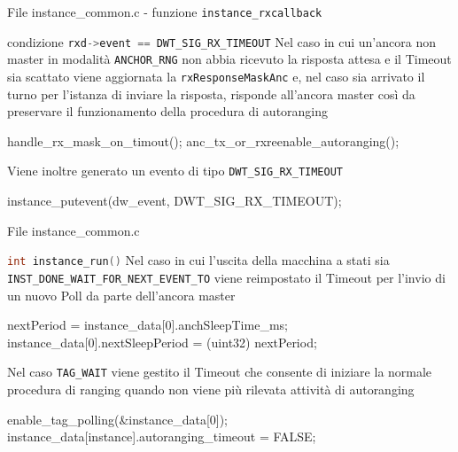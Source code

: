 \begin{frame}[fragile]{File instance\_common.c - funzione \lstinline[language=C]!instance_rxcallback!}
  \begin{block}{condizione \lstinline[language=C]!rxd->event == DWT_SIG_RX_TIMEOUT!}
    Nel caso in cui un'ancora \alert{non} master in modalità \lstinline[language=C]!ANCHOR_RNG! non abbia ricevuto la risposta attesa e il Timeout sia scattato viene
    aggiornata la \lstinline[language=C]!rxResponseMaskAnc! e, nel caso sia arrivato il turno per l'istanza di inviare la risposta, risponde all'ancora master così da preservare il funzionamento della procedura di autoranging
    \begin{C}
      handle_rx_mask_on_timout();
      anc_tx_or_rxreenable_autoranging();
    \end{C}
    Viene inoltre generato un evento di tipo \lstinline[language=C]!DWT_SIG_RX_TIMEOUT!
    \begin{C}
      instance_putevent(dw_event, DWT_SIG_RX_TIMEOUT);
    \end{C}
  \end{block}
\end{frame}

\begin{frame}[fragile]{File instance\_common.c}
  \begin{block}{\lstinline[language=C]!int instance_run()!}
    Nel caso in cui l'uscita della macchina a stati sia \lstinline[language=C]!INST_DONE_WAIT_FOR_NEXT_EVENT_TO! viene reimpostato il Timeout per l'invio di un nuovo Poll
    da parte dell'ancora \alert{master}
    \begin{C}
      nextPeriod = instance_data[0].anchSleepTime_ms;
      instance_data[0].nextSleepPeriod = (uint32) nextPeriod;
    \end{C}
    Nel caso \lstinline[language=C]!TAG_WAIT! viene gestito il Timeout che consente di iniziare la normale procedura di ranging quando
    non viene più rilevata attività di autoranging
    \begin{C}
      enable_tag_polling(&instance_data[0]);
      instance_data[instance].autoranging_timeout = FALSE;
    \end{C}
  \end{block}
\end{frame}


    
